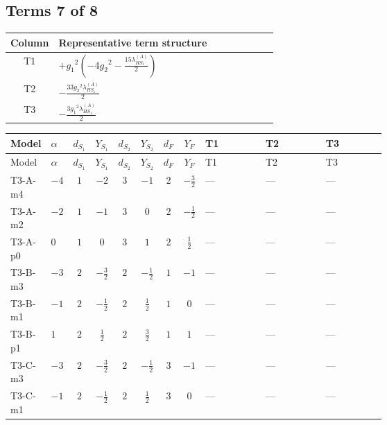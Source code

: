 \documentclass[8pt]{article}
\begin{document}
\begin{landscape}
\subsection*{Terms 7 of 8}
\begin{center}
\begin{tabular}{@{}c >{\raggedright\arraybackslash}p{0.82\linewidth}@{}}
\toprule
Column & Representative term structure \\
\midrule
T1 & \(\displaystyle +{g_1}^2 \left(-4 {g_2}^2-\frac{15 {\lambda_{HS_1}^{(A)}}}{2}\right)\) \\
\midrule
T2 & \(\displaystyle -\frac{33 {g_2}^2 {\lambda_{HS_1}^{(A)}}}{2}\) \\
\midrule
T3 & \(\displaystyle -\frac{3 {g_1}^2 {\lambda_{HS_1}^{(A)}}}{2}\) \\
\midrule
\bottomrule
\end{tabular}
\end{center}
\smallskip
\tiny
\begin{longtable}{@{}llcccccc >{\raggedright\arraybackslash}p{0.21\linewidth} >{\raggedright\arraybackslash}p{0.21\linewidth} >{\raggedright\arraybackslash}p{0.21\linewidth}@{}}
\toprule
Model & $\alpha$ & $d_{S_1}$ & $Y_{S_1}$ & $d_{S_2}$ & $Y_{S_2}$ & $d_F$ & $Y_F$ & T1 & T2 & T3 \\
\midrule
\endfirsthead
\toprule
Model & $\alpha$ & $d_{S_1}$ & $Y_{S_1}$ & $d_{S_2}$ & $Y_{S_2}$ & $d_F$ & $Y_F$ & T1 & T2 & T3 \\
\midrule
\endhead
T3-A-m4 & $-4$ & $1$ & $-2$ & $3$ & $-1$ & $2$ & $-\frac{3}{2}$ & --- & --- & --- \\
\midrule
T3-A-m2 & $-2$ & $1$ & $-1$ & $3$ & $0$ & $2$ & $-\frac{1}{2}$ & --- & --- & --- \\
\midrule
T3-A-p0 & $0$ & $1$ & $0$ & $3$ & $1$ & $2$ & $\frac{1}{2}$ & --- & --- & --- \\
\midrule
T3-B-m3 & $-3$ & $2$ & $-\frac{3}{2}$ & $2$ & $-\frac{1}{2}$ & $1$ & $-1$ & --- & --- & --- \\
\midrule
T3-B-m1 & $-1$ & $2$ & $-\frac{1}{2}$ & $2$ & $\frac{1}{2}$ & $1$ & $0$ & --- & --- & --- \\
\midrule
T3-B-p1 & $1$ & $2$ & $\frac{1}{2}$ & $2$ & $\frac{3}{2}$ & $1$ & $1$ & --- & --- & --- \\
\midrule
T3-C-m3 & $-3$ & $2$ & $-\frac{3}{2}$ & $2$ & $-\frac{1}{2}$ & $3$ & $-1$ & --- & --- & --- \\
\midrule
T3-C-m1 & $-1$ & $2$ & $-\frac{1}{2}$ & $2$ & $\frac{1}{2}$ & $3$ & $0$ & --- & --- & --- \\

\end{longtable}
\end{landscape}
\end{document}
